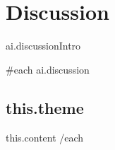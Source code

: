 \section{Discussion}

{{ai.discussionIntro}}

{{#each ai.discussion}}
	\subsection{ {{this.theme}} }
	{{this.content}}
{{/each}}






